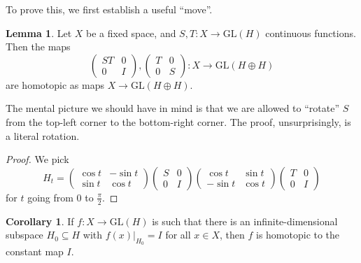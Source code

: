 \documentclass{shortart}
\theoremstyle{definition}
\newtheorem*{cor}{Corollary}
\newtheorem*{lemma}{Lemma}
\newcommand\id{I}
\newcommand\GL{\mathrm{GL}}
\begin{document}
To prove this, we first establish a useful ``move''.
\begin{lemma}
  Let $X$ be a fixed space, and $S, T: X \to \GL(H)$ continuous functions. Then the maps
  \[
    \begin{pmatrix}
      ST & 0\\
      0 & \id
    \end{pmatrix},
    \begin{pmatrix}
      T & 0\\
      0 & S
    \end{pmatrix}: X \to \GL(H \oplus H)
  \]
  are homotopic as maps $X \to \GL(H \oplus H)$.
\end{lemma}
The mental picture we should have in mind is that we are allowed to ``rotate'' $S$ from the top-left corner to the bottom-right corner. The proof, unsurprisingly, is a literal rotation.

\begin{proof}
  We pick
  \[
    H_t =
    \begin{pmatrix}
      \cos t & -\sin t\\
      \sin t & \cos t 
    \end{pmatrix}
    \begin{pmatrix}
      S & 0\\
      0 & \id
    \end{pmatrix}
    \begin{pmatrix}
      \cos t & \sin t\\
      -\sin t & \cos t
    \end{pmatrix}
    \begin{pmatrix}
      T & 0\\
      0 & \id
    \end{pmatrix}
  \]
  for $t$ going from $0$ to $\frac{\pi}{2}$.
\end{proof}

\begin{cor}
  If $f: X \to \GL(H)$ is such that there is an infinite-dimensional subspace $H_0 \subseteq H$ with $f(x)|_{H_0} = \id$ for all $x \in X$, then $f$ is homotopic to the constant map $I$.
\end{cor}
\end{document}
